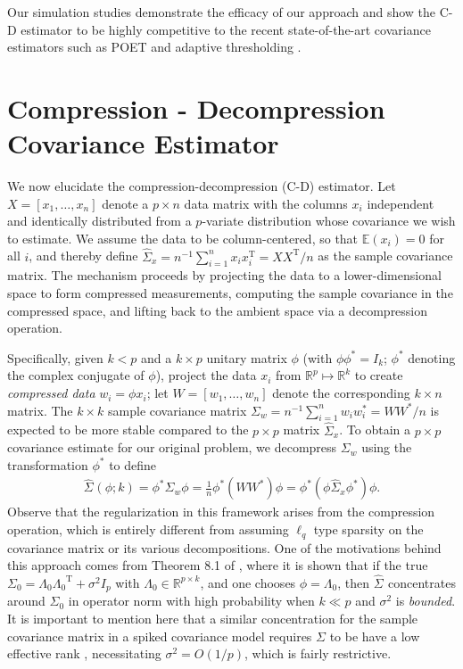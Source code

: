 \documentclass[11pt,oneside]{amsart}
\def\T{{\mathrm{\scriptscriptstyle T}}}
\begin{document}
Our simulation studies demonstrate the efficacy of our approach and show the C-D estimator to be highly competitive to the recent state-of-the-art covariance estimators such as POET \citep{fan2013large} and adaptive thresholding \citep{cai2011adaptive}. 

\section{Compression - Decompression Covariance Estimator} \label{Estimator}
We now elucidate the compression-decompression (C-D) estimator. Let $X = [x_1, \ldots, x_n]$ denote a $p \times n$ data matrix with the columns $x_i$ independent and identically distributed from a $p$-variate distribution whose covariance we wish to estimate. We assume the data to be column-centered, so that $\mathbb{E}(x_i) = 0$ for all $i$, and thereby define $\widehat{\Sigma}_x = n^{-1} \sum_{i=1}^n x_i x_i^{\T} = XX^{\T}/n$ as the sample covariance matrix. The mechanism proceeds by projecting the data to a lower-dimensional space to form compressed measurements, computing the sample covariance in the compressed space, and lifting back to the ambient space via a decompression operation. 

Specifically, given $k < p$ and a $k \times p$ unitary matrix $\phi$ (with $\phi \phi^* = I_k$; $\phi^*$ denoting the complex conjugate of $\phi$), project the data $x_i$ from ${\mathbb{R}}^{p} \mapsto {\mathbb{R}}^{k}$ to create {\em{compressed data}} $w_i = \phi x_i$; let $W = [w_1, \ldots, w_n]$ denote the corresponding $k \times n$ matrix. The $k \times k$ sample covariance matrix 
$\Sigma_{w} = n^{-1} \sum_{i=1}^n w_i w_i^{*} = W W^{*}/n$ is expected to be more stable compared to the $p \times p$ matrix $\widehat{\Sigma}_x$. To obtain a $p \times p$ covariance estimate for our original problem, we decompress $\Sigma_{w}$ using the transformation $\phi^*$ to define
\begin{align}\label{eq:est}
\widehat{\Sigma}_{}(\phi; k) = \phi^* \Sigma_w \phi = \frac{1}{n} \phi^* (W W^{*}) \phi = \phi^*(\phi \widehat{\Sigma}_x \phi^*) \phi. 
\end{align} 
Observe that the regularization in this framework arises from the compression operation, which is entirely different from assuming $\ell_q$ type sparsity on the covariance matrix or its various decompositions. One of the motivations behind this approach comes from Theorem 8.1 of \citet{pati2014posterior}, where
it is shown that if the true $\Sigma_0 = \Lambda_0{\Lambda_0}^{\T} + \sigma^2 I_p$ with $\Lambda_0 \in {\mathbb{R}}^{p \times k}$, and one chooses $\phi = \Lambda_0$, then ${\widehat{\Sigma}}_{}$ concentrates around $\Sigma_0$ in operator norm with high probability when $k \ll p$ and $\sigma^2$ is {\em bounded}. 
It is important to mention here that a similar concentration for the sample covariance matrix in a spiked covariance model requires $\Sigma$ to be have a low effective rank \citep{bunea2015sample}, necessitating $\sigma^2 = O(1/p)$, which is fairly restrictive.
\end{document}
